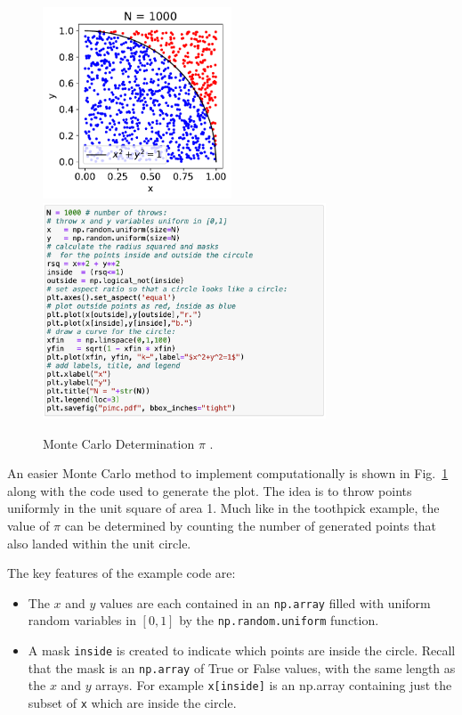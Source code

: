 \begin{figure}[htbp]
\begin{center}
  \includegraphics[width=0.50\textwidth]{figs/labs/monte_carlo/pimc.pdf}
  \includegraphics[width=0.75\textwidth]{figs/labs/monte_carlo/pimc-code.png} 
\caption{Monte Carlo Determination $\pi$ .}
\label{fig:pimc}
\end{center}
\end{figure}

An easier Monte Carlo method to implement computationally is shown in
Fig.~\ref{fig:pimc} along with the code used to generate the plot.
The idea is to throw points uniformly in the unit square of area 1.
Much like in the toothpick example, the value of $\pi$ can be
determined by counting the number of generated points that also landed
within the unit circle.

The key features of the example code are:
\begin{itemize}
\item The $x$ and $y$ values are each contained in an {\tt np.array} filled with uniform random variables in $[0,1]$ by the {\tt np.random.uniform} function.
\item A mask {\tt inside} is created to indicate which points are inside the circle.  Recall that the mask is an {\tt np.array} of True or False values, with the same length as the $x$ and $y$ arrays.  For example {\tt x[inside]} is an np.array containing just the subset of {\tt x} which are inside the circle.  
\end{itemize}

